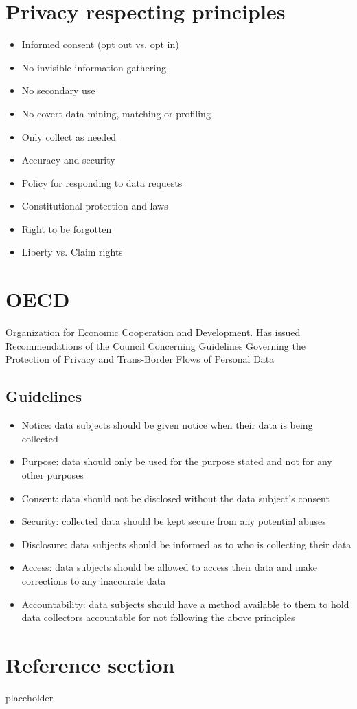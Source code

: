 \documentclass{article}
\begin{document}
\section{Privacy respecting principles}
\begin{itemize}
  \item Informed consent (opt out vs. opt in)
  \item No invisible information gathering
  \item No secondary use
  \item No covert data mining, matching or profiling
  \item Only collect as needed
  \item Accuracy and security
  \item Policy for responding to data requests
  \item Constitutional protection and laws
  \item Right to be forgotten
  \item Liberty vs. Claim rights
\end{itemize}

\section{OECD}

\begin{flushleft}
Organization for Economic Cooperation and Development. Has issued Recommendations of the Council Concerning Guidelines Governing
the Protection of Privacy and Trans-Border Flows of Personal Data
\end{flushleft}

\subsection{Guidelines}
\begin{itemize}
  \item Notice: data subjects should be given notice when their data is being collected
  \item Purpose: data should only be used for the purpose stated and not for any other purposes
  \item Consent: data should not be disclosed without the data subject’s consent
  \item Security: collected data should be kept secure from any potential abuses
  \item Disclosure: data subjects should be informed as to who is collecting their data
  \item Access: data subjects should be allowed to access their data and make corrections to any inaccurate data
  \item Accountability: data subjects should have a method available to them to hold data collectors accountable for not following the above principles
\end{itemize}

\pagebreak
\section*{Reference section} \label{sec:reference}
\begin{description}
	\item[placeholder] \hfill \\
\end{description}
\end{document}
